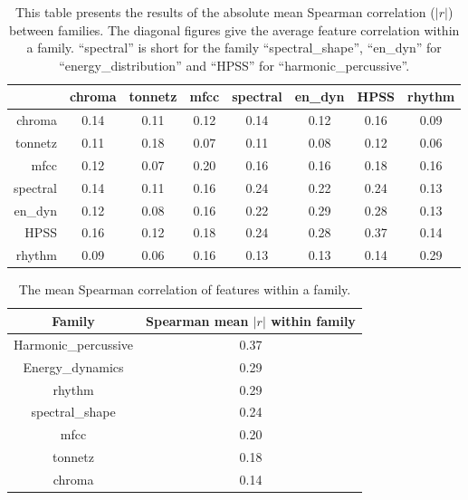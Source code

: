\documentclass[11pt]{article}
\begin{document}
\begin{table}
  \centering
  \begin{tabular}{|r|c|c|c|c|c|c|c|}
    \toprule
                    & chroma & tonnetz & mfcc & spectral & en\_dyn & HPSS & rhythm \\
    \midrule
chroma              &   0.14 &    0.11 & 0.12 &           0.14 &            0.12 &                 0.16&    0.09 \\
tonnetz             &   0.11 &    0.18 & 0.07 &           0.11 &            0.08 &                 0.12&    0.06 \\
mfcc                &   0.12 &    0.07 & 0.20 &           0.16 &            0.16 &                 0.18&    0.16 \\
spectral      &   0.14 &    0.11 & 0.16 &           0.24 &            0.22 &                 0.24&    0.13 \\
en\_dyn     &   0.12 &    0.08 & 0.16 &           0.22 &            0.29 &                 0.28&    0.13 \\
HPSS &   0.16 &    0.12 & 0.18 &           0.24 &            0.28 &                 0.37&    0.14 \\
rhythm              &   0.09 &    0.06 & 0.16 &           0.13 &            0.13 &                 0.14&    0.29 \\
\bottomrule
  \end{tabular}
    \caption{This table presents the results of the absolute mean Spearman correlation ($|r|$) between families. The diagonal figures give the average feature correlation within a family. ``spectral'' is short for the family ``spectral\_shape'', ``en\_dyn'' for ``energy\_distribution'' and ``HPSS'' for ``harmonic\_percussive''.}
    \label{tab:table1}
\end{table}

\begin{table}
  \centering
  \begin{tabular}{|c|c|}
    \toprule
    Family &	Spearman mean \(|r|\) within family \\
    \midrule
Harmonic\_percussive &	0.37\\
Energy\_dynamics	& 0.29\\
rhythm	& 0.29\\
spectral\_shape	& 0.24\\
mfcc &	0.20\\
tonnetz &	0.18\\
    chroma &	0.14\\
    \bottomrule
  \end{tabular}
  \caption{The mean Spearman correlation of features within a family.}
  \label{tab:table2}
\end{table}
\end{document}
